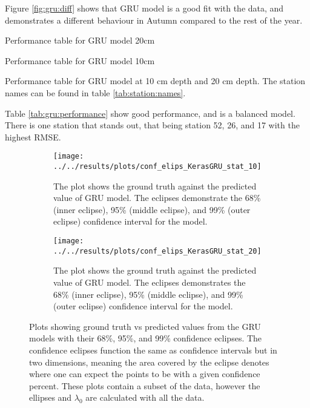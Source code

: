 Figure \ref{fig:gru:diff} shows that GRU model is a good fit with the data, and demonstrates a different behaviour in Autumn compared to the rest of the year.

\begin{table}
	\begin{subtable}{0.8\textwidth}
		
		\caption{Performance table for GRU model 20cm}
	\end{subtable}
	\begin{subtable}{0.8\textwidth}
		
		\caption{Performance table for GRU model 10cm}
	\end{subtable}
	\caption{Performance table for GRU model at 10 cm depth and 20 cm depth. The station names can be found in table \ref{tab:station:names}.}
	\label{tab:gru:performance}
\end{table}

Table \ref{tab:gru:performance} show good performance, and is a balanced model. There is one station that stands out, that being station 52, 26, and 17 with the highest RMSE. 

\begin{figure}
	\begin{subfigure}{0.45\linewidth}
		\centering
		\texttt{[image: ../../results/plots/conf\_elips\_KerasGRU\_stat\_10]}
		\caption[Confidence eclipse of GRU model 10cm]{The plot shows the ground truth against the predicted value of GRU model. The eclipses demonstrate the 68\% (inner eclipse), 95\% (middle eclipse), and 99\% (outer eclipse) confidence interval for the model.}
		\label{fig:confelipsKerasGRUstat10}
	\end{subfigure}
	\hfill
	\begin{subfigure}{0.45\textwidth}
		\centering
		\texttt{[image: ../../results/plots/conf\_elips\_KerasGRU\_stat\_20]}
		\caption[Confidence eclipse of GRU model 20cm]{The plot shows the ground truth against the predicted value of GRU model. The eclipses demonstrates the 68\% (inner eclipse), 95\% (middle eclipse), and 99\% (outer eclipse) confidence interval for the model.}
		\label{fig:confelipsKerasGRUstat20}
	\end{subfigure}
	\caption{Plots showing ground truth vs predicted values from the GRU models with their 68\%, 95\%, and 99\% confidence eclipses. The confidence eclipses function the same as confidence intervals but in two dimensions, meaning the area covered by the eclipse denotes where one can expect the points to be with a given confidence percent. These plots contain a subset of the data, however the ellipses and $\lambda_0$ are calculated with all the data.}
	\label{fig:gru:eclipse}
\end{figure}

